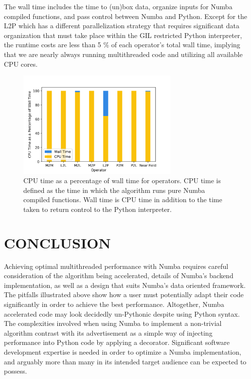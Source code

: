 \documentclass{IEEEcsmag}
\begin{document}
The wall time includes the time to (un)box data, organize inputs for Numba compiled functions, and pass control between Numba and Python. Except for the L2P which has a different parallelization strategy that requires significant data organization that must take place within the GIL restricted Python interpreter, the runtime costs are less than 5 \% of each operator's total wall time, implying that we are nearly always running multithreaded code and utilizing all available CPU cores. 

 \begin{figure}
	\centerline{\includegraphics[width=8cm]{figures/cpu_wall.png}}
    \caption{CPU time as a percentage of wall time for operators. CPU time is defined as the time in which the algorithm runs pure Numba compiled functions. Wall time is CPU time in addition to the time taken to return control to the Python interpreter. } 
	\label{fig:cpu_wall}
\end{figure}

\section{CONCLUSION}

Achieving optimal multithreaded performance with Numba requires careful consideration of the algorithm being accelerated, details of Numba's backend implementation, as well as a design that suits Numba's data oriented framework. The pitfalls illustrated above show how a user must potentially adapt their code significantly in order to achieve the best performance. Altogether, Numba accelerated code may look decidedly un-Pythonic despite using Python syntax. The complexities involved when using Numba to implement a non-trivial algorithm contrast with its advertisement as a simple way of injecting performance into Python code by applying a decorator. Significant software development expertise is needed in order to optimize a Numba implementation, and arguably more than many in its intended target audience can be expected to possess. 
\end{document}
